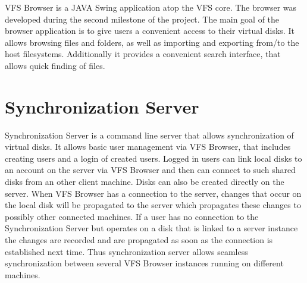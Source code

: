 \documentclass[a4paper,12pt]{article}
\begin{document}


VFS Browser is a JAVA Swing application atop the VFS core. The browser was
developed during the second milestone of the project. The main goal of the
browser application is to give users a convenient access to their virtual disks.
It allows browsing files and folders, as well as importing and
exporting from/to the host filesystems. Additionally it provides a convenient
search interface, that allows quick finding of files.











\section{Synchronization Server}

Synchronization Server is a command line server that allows synchronization of
virtual disks. It allows basic user management via VFS Browser, that includes
creating users and a login of created users. Logged in users can link local
disks to an account on the server via VFS Browser and then can connect to such
shared disks from an other client machine. Disks can also be created directly on
the server. When VFS Browser has a connection to the server, changes that occur
on the local disk will be propagated to the server which propagates these
changes to possibly other connected machines. If a user has
no connection to the Synchronization Server but operates on a disk that is
linked to a server instance the changes are recorded and are propagated as soon
as the connection is established next time. Thus synchronization server allows
seamless synchronization between several VFS Browser instances running on
different machines.


\end{document}
